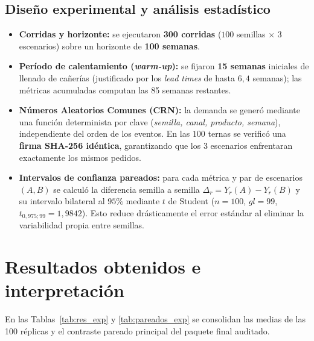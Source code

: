 \documentclass[11pt, a4paper]{article}
\begin{document}
\subsection{Diseño experimental y análisis estadístico}
\begin{itemize}[leftmargin=0.5cm, itemsep=2pt]
    \item \textbf{Corridas y horizonte:} se ejecutaron \textbf{300 corridas} ($100$ semillas $\times$ $3$ escenarios) sobre un horizonte de \textbf{100 semanas}.
    \item \textbf{Período de calentamiento (\textit{warm-up}):} se fijaron \textbf{15 semanas} iniciales de llenado de cañerías (justificado por los \textit{lead times} de hasta $6,4$ semanas); las métricas acumuladas computan las 85 semanas restantes.
    \item \textbf{Números Aleatorios Comunes (CRN):} la demanda se generó mediante una función determinista por clave (\textit{semilla, canal, producto, semana}), independiente del orden de los eventos. En las $100$ ternas se verificó una \textbf{firma SHA-256 idéntica}, garantizando que los 3 escenarios enfrentaran exactamente los mismos pedidos.
    \item \textbf{Intervalos de confianza pareados:} para cada métrica y par de escenarios $(A, B)$ se calculó la diferencia semilla a semilla $\Delta_r = Y_r(A) - Y_r(B)$ y su intervalo bilateral al $95\%$ mediante $t$ de Student ($n=100$, $gl=99$, $t_{0,975;99} = 1,9842$). Esto reduce drásticamente el error estándar al eliminar la variabilidad propia entre semillas.
\end{itemize}

\section{Resultados obtenidos e interpretación}

En las Tablas~\ref{tab:res_exp} y \ref{tab:pareados_exp} se consolidan las medias de las 100 réplicas y el contraste pareado principal del paquete final auditado.
\end{document}
